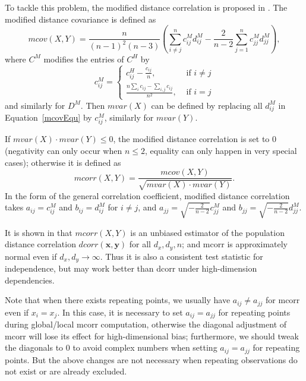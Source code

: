 \documentclass[11pt]{article}
\providecommand{\mb}[1]{\boldsymbol{#1}}
\begin{document}
To tackle this problem, the modified distance correlation is proposed in \cite{SzekelyRizzo2013a}. The modified distance covariance is defined as
\begin{equation}
\label{mcovEqu}
mcov(X,Y)=\frac{n}{(n-1)^2(n-3)}(\sum_{i \neq j}^{n}c^{M}_{ij}d^{M}_{ij}-\frac{2}{n-2}\sum_{j=1}^{n}c^{M}_{jj}d^{M}_{jj}),
\end{equation}
where $C^{M}$ modifies the entries of $C^{H}$ by
\[c^{M}_{ij} = \left\{
  \begin{array}{lr}
    c^{H}_{ij}-\frac{c_{ij}}{n}, & \mbox{ if } i \neq j \\
    \frac{n\sum_{i}c_{ij}-\sum_{i,j}c_{ij}}{n^2}, &\mbox{ if } i = j 
  \end{array}
\right.
\]
and similarly for $D^{M}$. Then $mvar(X)$ can be defined by replacing all $d^{M}_{ij}$ in Equation~\eqref{mcovEqu} by $c^{M}_{ij}$, similarly for $mvar(Y)$. 

If $mvar(X) \cdot mvar(Y) \leq 0$, the modified distance correlation is set to $0$ (negativity can only occur when $n\leq 2$, equality can only happen in very special cases); otherwise it is defined as
\begin{equation}
\label{mcorrEqu}
mcorr(X,Y)=\frac{mcov(X,Y)}{\sqrt{mvar(X) \cdot mvar(Y)}}.
\end{equation}
In the form of the general correlation coefficient, modified distance correlation takes $a_{ij}=c^{M}_{ij}$ and $b_{ij}=d^{M}_{ij}$ for $i \neq j$, and $a_{jj}=\sqrt{-\frac{2}{n-2}}c^{M}_{jj}$ and $b_{jj}=\sqrt{-\frac{2}{n-2}}d^{M}_{jj}$. %

It is shown in \cite{SzekelyRizzo2013a} that $mcorr(X,Y)$ is an unbiased estimator of the population distance correlation $dcorr(\mb{x},\mb{y})$ for all $d_{x}, d_{y}, n$; and mcorr is approximately normal even if $d_{x},d_{y} \rightarrow \infty$. Thus it is also a consistent test statistic for independence, but may work better than dcorr under high-dimension dependencies. 

Note that when there exists repeating points, we usually have $a_{ij} \neq a_{jj}$ for mcorr even if $x_{i}=x_{j}$. In this case, it is necessary to set $a_{ij}=a_{jj}$ for repeating points during global/local mcorr computation, otherwise the diagonal adjustment of mcorr will lose its effect for high-dimensional bias; furthermore, we should tweak the diagonals to $0$ to avoid complex numbers when setting $a_{ij}=a_{jj}$ for repeating points. But the above changes are not necessary when repeating observations do not exist or are already excluded.
\end{document}

